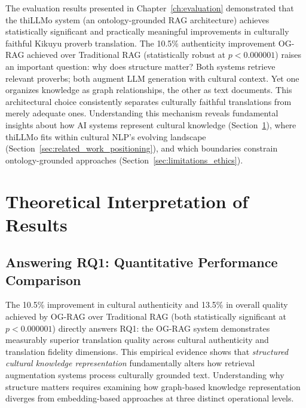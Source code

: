 \label{chap:discussion}

The evaluation results presented in Chapter~\ref{ch:evaluation} demonstrated that the thiLLMo system (an ontology-grounded RAG architecture) achieves statistically significant and practically meaningful improvements in culturally faithful Kikuyu proverb translation. The 10.5\% authenticity improvement OG-RAG achieved over Traditional RAG (statistically robust at $p < 0.000001$) raises an important question: why does structure matter? Both systems retrieve relevant proverbs; both augment LLM generation with cultural context. Yet one organizes knowledge as graph relationships, the other as text documents. This architectural choice consistently separates culturally faithful translations from merely adequate ones. Understanding this mechanism reveals fundamental insights about how AI systems represent cultural knowledge (Section~\ref{sec:theoretical_interpretation}), where thiLLMo fits within cultural NLP's evolving landscape (Section~\ref{sec:related_work_positioning}), and which boundaries constrain ontology-grounded approaches (Section~\ref{sec:limitations_ethics}).

\section{Theoretical Interpretation of Results}
\label{sec:theoretical_interpretation}

\subsection{Answering RQ1: Quantitative Performance Comparison}
\label{subsec:rq1_interpretation}

The 10.5\% improvement in cultural authenticity and 13.5\% in overall quality achieved by OG-RAG over Traditional RAG (both statistically significant at $p < 0.000001$) directly answers RQ1: the OG-RAG system demonstrates measurably superior translation quality across cultural authenticity and translation fidelity dimensions. This empirical evidence shows that \emph{structured cultural knowledge representation} fundamentally alters how retrieval augmentation systems process culturally grounded text. Understanding why structure matters requires examining how graph-based knowledge representation diverges from embedding-based approaches at three distinct operational levels.

